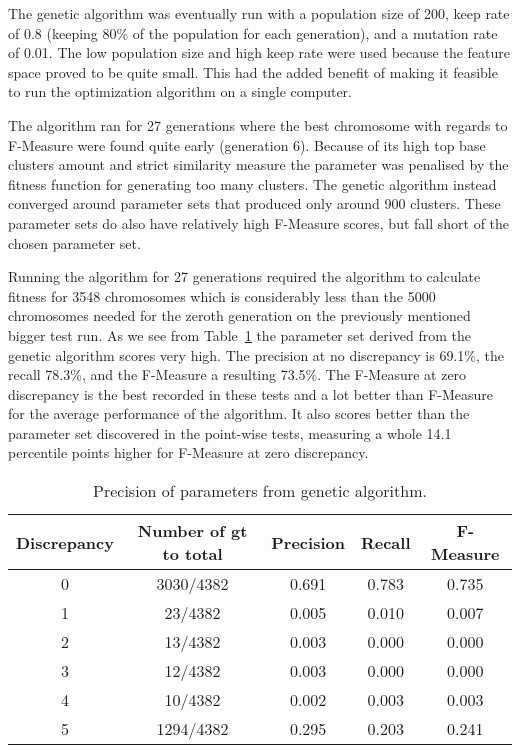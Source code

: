 The genetic algorithm was eventually run with a population size of 200, keep rate of 0.8 (keeping 80\% of the population for each generation), and a mutation rate of 0.01. The low population size and high keep rate were used because the feature space proved to be quite small. This had the added benefit of making it feasible to run the optimization algorithm on a single computer. 

The algorithm ran for 27 generations where the best chromosome with regards to F-Measure were found quite early (generation 6). Because of its high top base clusters amount and strict similarity measure the parameter was penalised by the fitness function for generating too many clusters. The genetic algorithm instead converged around parameter sets that produced only around 900 clusters. These parameter sets do also have relatively high F-Measure scores, but fall short of the chosen parameter set.

Running the algorithm for 27 generations required the algorithm to calculate fitness for 3548 chromosomes which is considerably less than the 5000 chromosomes needed for the zeroth generation on the previously mentioned bigger test run. As we see from Table~\ref{tab:geneticparametersresults} the parameter set derived from the genetic algorithm scores very high. The precision at no discrepancy is 69.1\%, the recall 78.3\%, and the F-Measure a resulting 73.5\%. The F-Measure at zero discrepancy is the best recorded in these tests and a lot better than F-Measure for the average performance of the algorithm. It also scores better than the parameter set discovered in the point-wise tests, measuring a whole 14.1 percentile points higher for F-Measure at zero discrepancy.


\begin{table}[H]
\begin{center}
\begin{tabular}{|c|c|ccc|}
\hline
Discrepancy & Number of gt to total & Precision & Recall & F-Measure\\ 
\hline
0&   3030/4382&   0.691&    0.783&    0.735\\ 
1&   23/4382&     0.005&    0.010&    0.007\\ 
2&   13/4382&     0.003&    0.000&    0.000\\ 
3&   12/4382&     0.003&    0.000&    0.000\\ 
4&   10/4382&     0.002&    0.003&    0.003\\ 
5&   1294/4382&   0.295&    0.203&    0.241\\
\hline
\end{tabular}
\end{center}
\caption{Precision of parameters from genetic algorithm.}
\label{tab:geneticparametersresults}
\end{table}







